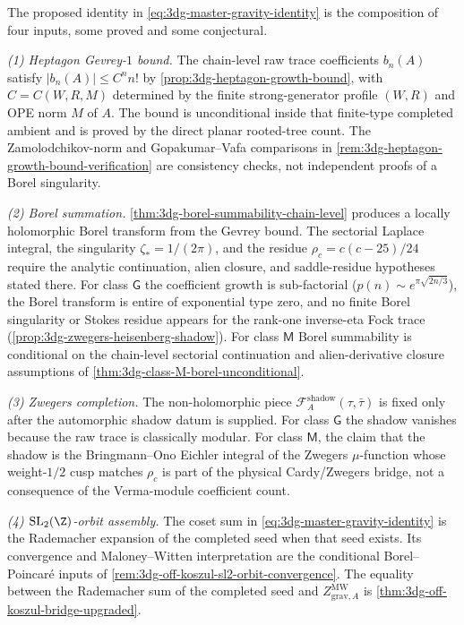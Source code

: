 \begin{remark}
The proposed identity in \eqref{eq:3dg-master-gravity-identity} is
the composition of four inputs, some proved and some conjectural.

\emph{(1) Heptagon Gevrey-$1$ bound.} The chain-level raw trace
coefficients $b_{n}(A)$ satisfy $|b_{n}(A)| \le C^{n} n!$ by
\autoref{prop:3dg-heptagon-growth-bound}, with
$C = C(W,R,M)$ determined by the finite strong-generator profile
\((W,R)\) and OPE norm \(M\) of $A$. The bound is unconditional inside
that finite-type completed ambient and is proved by the direct planar
rooted-tree count. The Zamolodchikov-norm and
Gopakumar--Vafa \cite{GopakumarVafa1998} comparisons in
\autoref{rem:3dg-heptagon-growth-bound-verification} are consistency
checks, not independent proofs of a Borel singularity.

\emph{(2) Borel summation.} \autoref{thm:3dg-borel-summability-chain-level}
produces a locally holomorphic Borel transform from the Gevrey bound.
The sectorial Laplace integral, the singularity
\(\zeta_{\ast} = 1/(2\pi)\), and the residue
\(\rho_{c}=c(c-25)/24\) require the analytic continuation, alien
closure, and saddle-residue hypotheses stated there. For class
\(\mathsf G\) the coefficient growth is sub-factorial
($p(n) \sim e^{\pi\sqrt{2n/3}}$), the Borel transform is entire of
exponential type zero, and no finite Borel singularity or Stokes
residue appears for the rank-one inverse-eta Fock trace
(\autoref{prop:3dg-zwegers-heisenberg-shadow}). For class
\(\mathsf M\) Borel summability is conditional on the chain-level
sectorial continuation and alien-derivative closure assumptions of
\autoref{thm:3dg-class-M-borel-unconditional}.

\emph{(3) Zwegers completion.} The non-holomorphic piece
\(\mathcal F^{\mathrm{shadow}}_{A}(\tau,\bar\tau)\) is fixed only
after the automorphic shadow datum is supplied. For class
\(\mathsf G\) the shadow vanishes because the raw trace is classically
modular. For class \(\mathsf M\), the claim that the shadow is the
Bringmann--Ono \cite{BringmannOno2007} Eichler integral of the
Zwegers \(\mu\)-function whose weight-\(1/2\) cusp matches
\(\rho_c\) is part of the physical Cardy/Zwegers bridge, not a
consequence of the Verma-module coefficient count.

\emph{(4) $\mathrm{SL}_{2}(\Z)$-orbit assembly.} The coset sum in
\eqref{eq:3dg-master-gravity-identity} is the Rademacher expansion of
the completed seed when that seed exists. Its convergence and
Maloney--Witten interpretation are the conditional Borel--Poincar\'e
inputs of \autoref{rem:3dg-off-koszul-sl2-orbit-convergence}. The
equality between the Rademacher sum of the completed seed and
\(Z^{\mathrm{MW}}_{\mathrm{grav}, A}\) is
\autoref{thm:3dg-off-koszul-bridge-upgraded}.


\end{remark}
